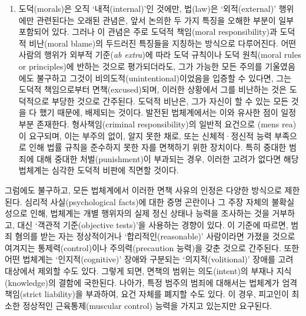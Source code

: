 \begin{enumerate}
\def\labelenumi{(\roman{enumi})}
\setcounter{enumi}{2}
\tightlist
\item
   도덕(morals)은 오직 `내적(internal)'인 것에만, 법(law)은
  `외적(external)' 행위에만 관련된다는 오래된 관념은, 앞서 논의한 두
  가지 특징을 오해한 부분이 일부 포함되어 있다. 그러나 이 관념은 주로
  도덕적 책임(moral responsibility)과 도덕적 비난(moral blame)의
  두드러진 특징들을 지칭하는 방식으로 다루어진다. 어떤 사람의 행위가
  외부적 기준(\emph{ab extra})에 따라 도덕 규칙이나 도덕 원칙(moral
  rules or principles)에 반하는 것으로 평가되더라도, 그가 가능한 모든
  주의를 기울였음에도 불구하고 그것이 비의도적(unintentional)이었음을
  입증할 수 있다면, 그는 도덕적 책임으로부터 면책(excused)되며, 이러한
  상황에서 그를 비난하는 것은 도덕적으로 부당한 것으로 간주된다. 도덕적
  비난은, 그가 자신이 할 수 있는 모든 것을 다 했기 때문에, 배제되는
  것이다. 발전된 법체계에서는 이와 유사한 점이 일정 부분 존재한다.
  형사책임(criminal responsibility)의 일반적 요건으로 (mens
  rea)이 요구되며, 이는 부주의 없이, 알지 못한 채로, 또는 신체적·정신적
  능력 부족으로 인해 법률 규칙을 준수하지 못한 자를 면책하기 위한
  장치이다. 특히 중대한 범죄에 대해 중대한 처벌(punishment)이 부과되는
  경우, 이러한 고려가 없다면 해당 법체계는 심각한 도덕적 비판에 직면할
  것이다.
\end{enumerate}

그럼에도 불구하고, 모든 법체계에서 이러한 면책 사유의 인정은 다양한
방식으로 제한된다. 심리적 사실(psychological facts)에 대한 증명 곤란이나
그 주장 자체의 불확실성으로 인해, 법체계는 개별 행위자의 실제 정신
상태나 능력을 조사하는 것을 거부하고, 대신 `객관적 기준(objective
tests)'을 사용하는 경향이 있다. 이 기준에 따르면, 범죄 혐의를 받는 자는
정상적이거나 `합리적인(reasonable)' 사람이라면 가졌을 것으로 여겨지는
통제력(control)이나 주의력(precaution 능력)을 갖춘 것으로 간주된다. 또한
어떤 법체계는 `인지적(cognitive)' 장애와 구분되는 `의지적(volitional)'
장애를 고려 대상에서 제외할 수도 있다. 그렇게 되면, 면책의 범위는
의도(intent)의 부재나 지식(knowledge)의 결함에 국한된다. 나아가, 특정
범주의 범죄에 대해서는 법체계가 엄격책임(strict liability)을 부과하여,
 요건 자체를 폐지할 수도 있다. 이 경우, 피고인이
최소한 정상적인 근육통제(muscular control) 능력을 가지고 있는지만
요구된다.

